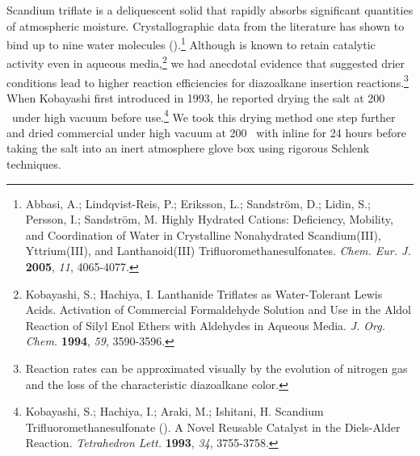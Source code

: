 Scandium triflate is a deliquescent solid that rapidly absorbs significant quantities of atmospheric
moisture. Crystallographic data from the literature has shown  to bind up to nine water
molecules ().\footnote{{\frenchspacing Abbasi, A.; Lindqvist-Reis, P.;
Eriksson, L.; Sandstr\"{o}m, D.; Lidin, S.; Persson, I.; Sandstr\"{o}m, M. Highly Hydrated Cations:
Deficiency, Mobility, and Coordination of Water in Crystalline Nonahydrated Scandium(III),
Yttrium(III), and Lanthanoid(III) Trifluoromethanesulfonates. \textit{Chem. Eur. J.} \textbf{2005},
\textit{11}, 4065-4077.}} Although  is known to retain catalytic activity even in
aqueous media,\footnote{{\frenchspacing Kobayashi, S.; Hachiya, I. Lanthanide Triflates as
Water-Tolerant Lewis Acids. Activation of Commercial Formaldehyde Solution and Use in the Aldol
Reaction of Silyl Enol Ethers with Aldehydes in Aqueous Media. \textit{J. Org. Chem.} \textbf{1994},
\textit{59}, 3590-3596.}} we had anecdotal evidence that suggested drier conditions lead to higher
reaction efficiencies for diazoalkane insertion reactions.\footnote{Reaction rates can be
approximated visually by the evolution of nitrogen gas and the loss of the characteristic
diazoalkane color.} When Kobayashi first introduced  in
1993, he reported drying the salt at 200 \degc\ under high vacuum before use.\footnote{{\frenchspacing Kobayashi, S.; Hachiya, I.; Araki, M.; Ishitani, H.
Scandium Trifluoromethanesulfonate (). A Novel Reusable Catalyst in the Diels-Alder
Reaction. \textit{Tetrahedron Lett.} \textbf{1993}, \textit{34}, 3755-3758.}} We took this drying
method one step further and dried commercial  under high vacuum at 200 \degc\  with
inline  for 24 hours before taking the salt into an inert atmosphere glove box using
rigorous Schlenk techniques.

